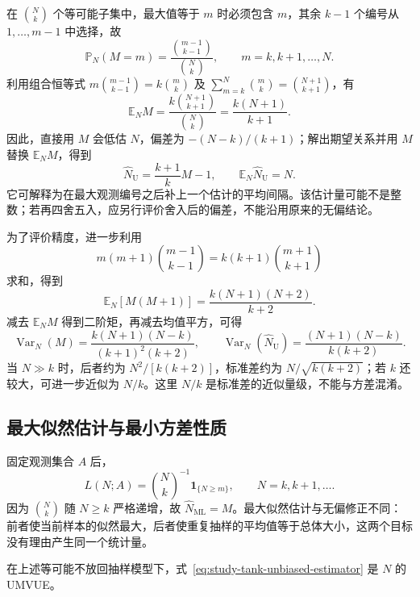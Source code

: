 在 $\binom Nk$ 个等可能子集中，最大值等于 $m$ 时必须包含 $m$，其余 $k-1$ 个编号从 $1,\ldots,m-1$ 中选择，故
\begin{equation}
  \mathbb P_N(M=m)
    =\frac{\binom{m-1}{k-1}}{\binom Nk},
  \qquad m=k,k+1,\ldots,N.
  \label{eq:study-tank-maximum-mass}
\end{equation}
利用组合恒等式 $m\binom{m-1}{k-1}=k\binom mk$ 及 $\sum_{m=k}^N\binom mk=\binom{N+1}{k+1}$，有
\begin{equation}
  \mathbb E_N M
    =\frac{k\binom{N+1}{k+1}}{\binom Nk}
    =\frac{k(N+1)}{k+1}.
  \label{eq:study-tank-maximum-mean}
\end{equation}
因此，直接用 $M$ 会低估 $N$，偏差为 $-(N-k)/(k+1)$；解出期望关系并用 $M$ 替换 $\mathbb E_NM$，得到
\begin{equation}
  \widehat N_{\mathrm U}=\frac{k+1}{k}M-1,
  \qquad \mathbb E_N\widehat N_{\mathrm U}=N.
  \label{eq:study-tank-unbiased-estimator}
\end{equation}
它可解释为在最大观测编号之后补上一个估计的平均间隔。该估计量可能不是整数；若再四舍五入，应另行评价舍入后的偏差，不能沿用原来的无偏结论。

为了评价精度，进一步利用
\[
  m(m+1)\binom{m-1}{k-1}
      =k(k+1)\binom{m+1}{k+1}
\]
求和，得到
\[
  \mathbb E_N[M(M+1)]=\frac{k(N+1)(N+2)}{k+2}.
\]
减去 $\mathbb E_N M$ 得到二阶矩，再减去均值平方，可得
\begin{equation}
  \operatorname{Var}_N(M)
    =\frac{k(N+1)(N-k)}{(k+1)^2(k+2)},\qquad
  \operatorname{Var}_N(\widehat N_{\mathrm U})
    =\frac{(N+1)(N-k)}{k(k+2)}.
  \label{eq:study-tank-estimator-variance}
\end{equation}
当 $N\gg k$ 时，后者约为 $N^2/[k(k+2)]$，标准差约为 $N/\sqrt{k(k+2)}$；若 $k$ 还较大，可进一步近似为 $N/k$。这里 $N/k$ 是标准差的近似量级，不能与方差混淆。

\subsection{最大似然估计与最小方差性质}

固定观测集合 $A$ 后，
\[
  L(N;A)=\binom Nk^{-1}\mathbf1_{\{N\ge m\}},
  \qquad N=k,k+1,\ldots.
\]
因为 $\binom Nk$ 随 $N\ge k$ 严格递增，故 $\widehat N_{\mathrm{ML}}=M$。最大似然估计与无偏修正不同：前者使当前样本的似然最大，后者使重复抽样的平均值等于总体大小，这两个目标没有理由产生同一个统计量。

\begin{proposition}[坦克总数的最小方差无偏估计]
\label{prop:study-tank-umvue}
在上述等可能不放回抽样模型下，式~\eqref{eq:study-tank-unbiased-estimator} 是 $N$ 的 UMVUE。
\end{proposition}

